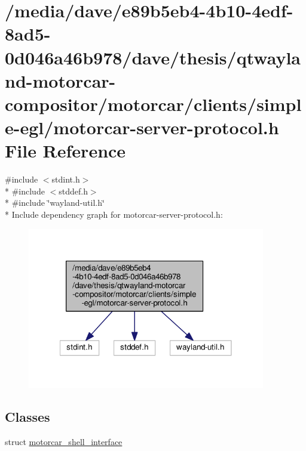 \hypertarget{clients_2simple-egl_2motorcar-server-protocol_8h}{\section{/media/dave/e89b5eb4-\/4b10-\/4edf-\/8ad5-\/0d046a46b978/dave/thesis/qtwayland-\/motorcar-\/compositor/motorcar/clients/simple-\/egl/motorcar-\/server-\/protocol.h File Reference}
\label{clients_2simple-egl_2motorcar-server-protocol_8h}
}
{\ttfamily \#include $<$stdint.\-h$>$}\\*
{\ttfamily \#include $<$stddef.\-h$>$}\\*
{\ttfamily \#include \char`\"{}wayland-\/util.\-h\char`\"{}}\\*
Include dependency graph for motorcar-\/server-\/protocol.h\-:\nopagebreak
\begin{figure}[H]
\begin{center}
\leavevmode
\includegraphics[width=294pt]{clients_2simple-egl_2motorcar-server-protocol_8h__incl}
\end{center}
\end{figure}
\subsection*{Classes}
\begin{DoxyCompactItemize}
\item 
struct \hyperlink{structmotorcar__shell__interface}{motorcar\-\_\-shell\-\_\-interface}
\end{DoxyCompactItemize}
